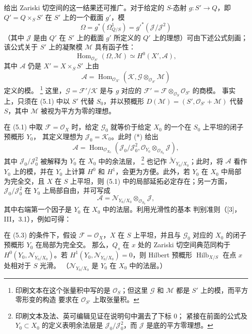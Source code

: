 给出 Zariski 切空间的这一结果还可推广。对于给定的 $S$-态射
$g:S'\longrightarrow Q$，即 $Q'=Q\times_SS'$ 在 $S'$ 上的一个截面
$g'$，模
\[
\Omega=g^*(\Omega^1_{Q/S})=g'^*(\mathcal J/\mathcal J^2)
\]
（其中 $\mathcal J$ 是由 $Q'$ 在 $S'$ 上的截面 $g'$ 所定义的
$Q'$ 上的理想）可由下述公式刻画；该公式关于 $S'$ 上的凝聚模
$\mathcal M$ 具有函子性：
\[
\operatorname{Hom}_{\mathcal O_{S'}}(\Omega,\mathcal M)
\simeq H^0(X',\mathcal A),
\]
其中 $\mathcal A$ 仍是 $X'=X\times_SS'$ 上由
\[
\mathcal A=\operatorname{Hom}_{\mathcal O_{X'}}
(\mathcal K,\mathcal G\otimes_{\mathcal O_{S'}}\mathcal M)
\]
定义的模。
\footnote{印刷文本在这个张量积中写的是 $\mathcal O_S$；但这里
$\mathcal G$ 和 $\mathcal M$ 都是 $S'$ 上的模，而平方零形变的构造
要求在 $\mathcal O_{S'}$ 上取张量积。}
这里，$\mathcal G=\mathcal F'/\mathcal K$ 是与 $g$ 对应的
$\mathcal F'=\mathcal F\otimes_{\mathcal O_S}\mathcal O_{S'}$ 的商模。
事实上，只须在 (5.1) 中以 $S'$ 代替 $S_0$，并以预概形
$D(\mathcal M)=(S',\mathcal O_{S'}+\mathcal M)$ 代替 $S$，其中
$\mathcal M$ 被视为平方为零的理想。

在 (5.1) 中取 $\mathcal F=\mathcal O_X$ 时，给定 $\mathcal G_0$
就等价于给定 $X_0$ 的一个在 $S_0$ 上平坦的闭子预概形 $Y_0$，
其定义理想为 $\mathcal J_0=\mathcal K_0$。此时 (*) 给出
\[
\mathcal A=\operatorname{Hom}_{\mathcal O_{X_0}}
(\mathcal J_0/\mathcal J_0^2,
\mathcal O_{Y_0}\otimes_{\mathcal O_{S_0}}\mathcal J),
\]
其中 $\mathcal J_0/\mathcal J_0^2$ 被解释为 $Y_0$ 在 $X_0$ 中的余法层，
\footnote{印刷文本及法、英可编辑见证在说明句中漏去了下标 $0$；
紧接在前面的公式及 $Y_0\subset X_0$ 的定义表明余法层是
$\mathcal J_0/\mathcal J_0^2$，而 $\mathcal J$ 是底的平方零理想。}
也记作
$\check{\mathcal N}_{Y_0/X_0}$；此时，将 $\mathcal A$ 看作 $Y_0$
上的模，并在 $Y_0$ 上计算 $H^0$ 和 $H^1$，会更为方便。此外，若
$Y_0$ 在 $X_0$ 中局部为完全交，且 $X$ 在 $S$ 上平坦，则 (5.1)
中的局部延拓必定存在；另一方面，$\mathcal J_0/\mathcal J_0^2$ 在
$Y_0$ 上局部自由，并可写成
\[
\mathcal A=\mathcal N_{Y_0/X_0}\otimes_{\mathcal O_{S_0}}\mathcal J,
\]
其中右端第一个因子是 $Y_0$ 在 $X_0$ 中的法层。利用光滑性的基本
判别准则（[3]，III，3.1），例如可得：

 在 (5.3) 的条件下，假设
$\mathcal F=\mathcal O_X$，$X$ 在 $S$ 上平坦，并且与
$\mathcal G_0$ 对应的 $X_0$ 的闭子预概形 $Y_0$ 在局部为完全交。
那么，$Q_s$ 在 $x$ 处的 Zariski 切空间典范同构于
$H^0(Y_0,\mathcal N_{Y_0/X_0})$。若
$H^1(Y_0,\mathcal N_{Y_0/X_0})=0$，则 Hilbert 预概形
$\operatorname{Hilb}_{X/S}$ 在点 $x$ 处相对于 $S$ 光滑。
（$\mathcal N_{Y_0/X_0}$ 是 $Y_0$ 在 $X_0$ 中的法层。）

